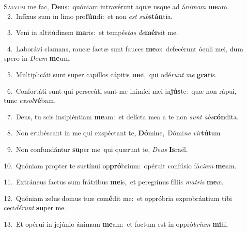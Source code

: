\lettrine{\initial\textcolor{\initialcolor}{S}}{alvum} me fac, \textbf{De}\-us:~\star quóniam intravérunt aquæ usque ad á\-\textit{ni}\-\textit{mam} \textbf{me}\-am.\\
{\numbfont\textcolor{\numbcolor}{~2.}}~Infíxus sum in limo pro\-\textbf{fún}\-di:~\star et non \textit{est} \textit{sub}\-\textbf{stán}tia.\par
{\numbfont\textcolor{\numbcolor}{~3.}}~Veni in altitúdinem \textbf{ma}\-ris:~\star et tempés\textit{tas} \textit{de}\-\textbf{mér}sit me.\par
{\numbfont\textcolor{\numbcolor}{~4.}}~Laborávi clamans, raucæ factæ sunt fauces \textbf{me}\-æ:~\star defecérunt óculi mei, dum spero in \textit{De}\-\textit{um} \textbf{me}\-um.\par
{\numbfont\textcolor{\numbcolor}{~5.}}~Multiplicáti sunt super capíllos cápitis \textbf{me}\-i,~\star qui odé\textit{runt} \textit{me} \textbf{gra}\-tis.\par
{\numbfont\textcolor{\numbcolor}{~6.}}~Confortáti sunt qui persecúti sunt me inimíci mei in\-\textbf{jús}\-te:~\star quæ non rápui, tunc \textit{ex}\-\textit{sol}\textbf{vé}bam.\par
{\numbfont\textcolor{\numbcolor}{~7.}}~Deus, tu scis insipiéntiam \textbf{me}\-am:~\star et delícta mea a te non \textit{sunt} \textit{abs}\-\textbf{cón}dita.\par
{\numbfont\textcolor{\numbcolor}{~8.}}~Non erubéscant in me qui exspéctant te, \textbf{Dó}\-mine,~\star Dómi\textit{ne} \textit{vir}\-\textbf{tú}tum\par
{\numbfont\textcolor{\numbcolor}{~9.}}~Non confundántur \textbf{su}\-per me~\star qui quærunt te, \textit{De}\-\textit{us} \textbf{Is}\-raël.\par
{\numbfont\textcolor{\numbcolor}{10.}}~Quóniam propter te sustínui op\-\textbf{pró}\-brium:~\star opéruit confúsio fá\-\textit{ci}\-\textit{em} \textbf{me}\-am.\par
{\numbfont\textcolor{\numbcolor}{11.}}~Extráneus factus sum frátribus \textbf{me}\-is,~\star et peregrínus fíliis \textit{ma}\-\textit{tris} \textbf{me}\-æ.\par
{\numbfont\textcolor{\numbcolor}{12.}}~Quóniam zelus domus tuæ com\-\textbf{é}\-dit me:~\star et oppróbria exprobrántium tibi ceci\-\textit{dé}\-\textit{runt} \textbf{su}\-per me.\par
{\numbfont\textcolor{\numbcolor}{13.}}~Et opérui in jejúnio ánimam \textbf{me}\-am:~\star et factum est in oppró\-\textit{bri}\-\textit{um} \textbf{mi}\-hi.\par
